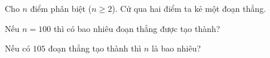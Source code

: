 \begin{bt}%
Cho $n$ điểm phân biệt ($n\ge 2$). Cứ qua hai điểm ta kẻ một đoạn thẳng.
\begin{enumEX}{1}
\item Nếu $n=100$ thì có bao nhiêu đoạn thẳng được tạo thành?
\item Nếu có $105$ đoạn thẳng tạo thành thì $n$ là bao nhiêu?
\end{enumEX}
\end{bt}